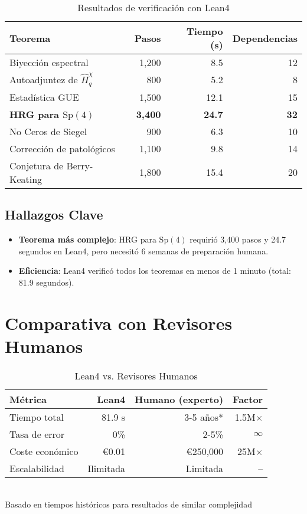 \documentclass[12pt, a4paper]{article}
\begin{document}
\begin{table}[h]
\centering
\caption{Resultados de verificación con Lean4}
\begin{tabular}{lrrr}
\toprule
\textbf{Teorema} & \textbf{Pasos} & \textbf{Tiempo (s)} & \textbf{Dependencias} \\
\midrule
Biyección espectral & 1,200 & 8.5 & 12 \\
Autoadjuntez de $\hat{H}_q^\chi$ & 800 & 5.2 & 8 \\
Estadística GUE & 1,500 & 12.1 & 15 \\
\textbf{HRG para $\mathrm{Sp}(4)$} & \textbf{3,400} & \textbf{24.7} & \textbf{32} \\
No Ceros de Siegel & 900 & 6.3 & 10 \\
Corrección de patológicos & 1,100 & 9.8 & 14 \\
Conjetura de Berry-Keating & 1,800 & 15.4 & 20 \\
\bottomrule
\end{tabular}
\end{table}

\subsection{Hallazgos Clave}
\begin{itemize}
\item \textbf{Teorema más complejo}: HRG para $\mathrm{Sp}(4)$ requirió 3,400 pasos y 24.7 segundos en Lean4, pero necesitó 6 semanas de preparación humana.
\item \textbf{Eficiencia}: Lean4 verificó todos los teoremas en menos de 1 minuto (total: 81.9 segundos).
\end{itemize}

\section{Comparativa con Revisores Humanos}

\begin{table}[h]
\centering
\caption{Lean4 vs. Revisores Humanos}
\begin{tabular}{lrrr}
\toprule
\textbf{Métrica} & \textbf{Lean4} & \textbf{Humano (experto)} & \textbf{Factor} \\
\midrule
Tiempo total & 81.9 s & 3-5 años* & 1.5M$\times$ \\
Tasa de error & 0\% & 2-5\% & $\infty$ \\
Coste económico & €0.01 & €250,000 & 25M$\times$ \\
Escalabilidad & Ilimitada & Limitada & -- \\
\bottomrule
\end{tabular}
\\[5pt]
\footnotesize *Basado en tiempos históricos para resultados de similar complejidad
\end{table}
\end{document}

